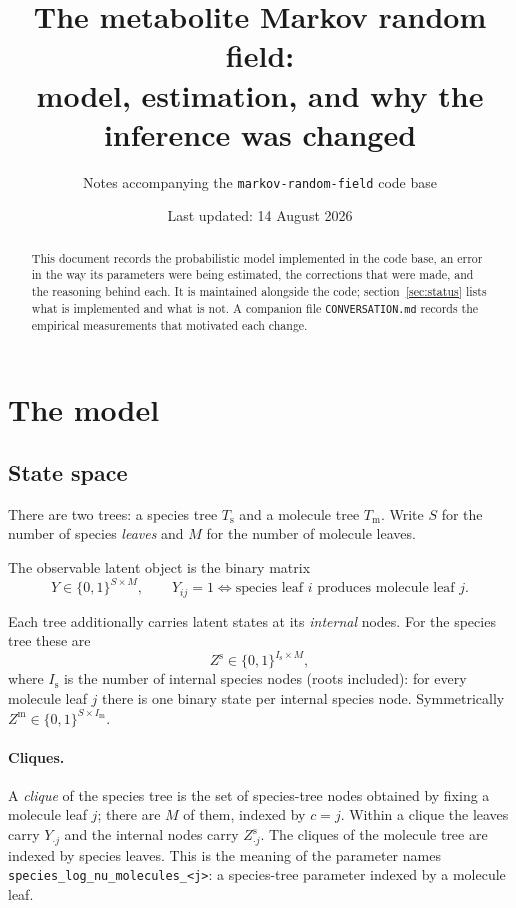 \documentclass[11pt,a4paper]{article}
\title{The metabolite Markov random field:\\
model, estimation, and why the inference was changed}
\author{Notes accompanying the \texttt{markov-random-field} code base}
\date{Last updated: 14 August 2026}
\newcommand{\Ys}{Y}
\newcommand{\Zs}{Z^{\mathrm{s}}}
\newcommand{\Zm}{Z^{\mathrm{m}}}
\begin{document}
\maketitle

\begin{abstract}
This document records the probabilistic model implemented in the code base, an error in the
way its parameters were being estimated, the corrections that were made, and the reasoning
behind each. It is maintained alongside the code; section~\ref{sec:status} lists what is
implemented and what is not. A companion file \texttt{CONVERSATION.md} records the
empirical measurements that motivated each change.
\end{abstract}

\tableofcontents

\section{The model}
\label{sec:model}

\subsection{State space}

There are two trees: a species tree $T_{\mathrm{s}}$ and a molecule tree $T_{\mathrm{m}}$.
Write $S$ for the number of species \emph{leaves} and $M$ for the number of molecule leaves.

The observable latent object is the binary matrix
\[
  \Ys \in \{0,1\}^{S \times M},
  \qquad
  \Ys_{ij} = 1 \iff \text{species leaf } i \text{ produces molecule leaf } j .
\]

Each tree additionally carries latent states at its \emph{internal} nodes. For the species
tree these are
\[
  \Zs \in \{0,1\}^{I_{\mathrm{s}} \times M},
\]
where $I_{\mathrm{s}}$ is the number of internal species nodes (roots included): for every
molecule leaf $j$ there is one binary state per internal species node. Symmetrically
$\Zm \in \{0,1\}^{S \times I_{\mathrm{m}}}$.

\paragraph{Cliques.} A \emph{clique} of the species tree is the set of species-tree nodes
obtained by fixing a molecule leaf $j$; there are $M$ of them, indexed by $c = j$. Within a
clique the leaves carry $\Ys_{\cdot j}$ and the internal nodes carry $\Zs_{\cdot j}$. The
cliques of the molecule tree are indexed by species leaves. This is the meaning of the
parameter names \texttt{species\_log\_nu\_molecules\_<j>}: a species-tree parameter indexed
by a molecule leaf.
\end{document}
